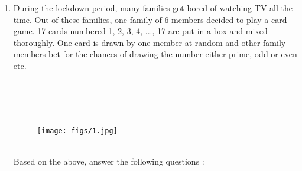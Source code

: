 \documentclass{exam}
\begin{document}
	\begin{enumerate}

		\item During the lockdown period, many families got bored of watching TV all the time. Out of these families, one family of 6 members decided to play a card game. 17 cards numbered 1, 2, 3, 4, ..., 17 are put in a box and mixed thoroughly. One card is drawn by one member at random and other family members bet for the chances of drawing the number either prime, odd or even etc. 
		\\
		\\
		\\
		\\
		\\
        \begin{figure}[h!]
          \centering
          \texttt{[image: figs/1.jpg]}
        \end{figure} 
        \\
		Based on the above, answer the following questions : 
		

\end{enumerate}
\end{document}
